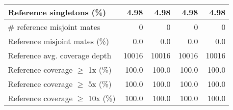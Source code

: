 \documentclass[12pt,a4paper]{article}
\begin{document}
\begin{table}[ht]
\begin{center}
\begin{tabular}{|l*{4}{|r}|}
Reference singletons (\%) & 4.98 & 4.98 & 4.98 & 4.98 \\ \hline
\# reference misjoint mates & 0 & 0 & 0 & 0 \\ \hline
Reference misjoint mates (\%) & 0.0 & 0.0 & 0.0 & 0.0 \\ \hline
Reference avg. coverage depth & 10016 & 10016 & 10016 & 10016 \\ \hline
Reference coverage $\geq$ 1x (\%) & 100.0 & 100.0 & 100.0 & 100.0 \\ \hline
Reference coverage $\geq$ 5x (\%) & 100.0 & 100.0 & 100.0 & 100.0 \\ \hline
Reference coverage $\geq$ 10x (\%) & 100.0 & 100.0 & 100.0 & 100.0 \\ \hline
\end{tabular}
\end{center}
\end{table}
\end{document}
